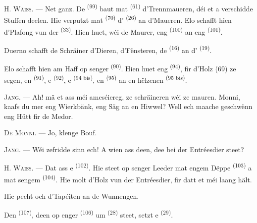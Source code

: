 \VUsaut{3.0mm}
\VUsaut{3.0mm}

H. \textsc{Wäiss}. --- Net ganz. De  \textsuperscript{(99)} baut mat
 \textsuperscript{(61)} d'Trennmaueren, déi et a verschidde Stuffen
deelen. Hie verputzt mat  \textsuperscript{(70)} d'
\textsuperscript{(26)} an d'Maueren. Elo schafft hien d'Plafong vun der
 \textsuperscript{(33)}. Hien huet, wéi de Maurer, eng 
\textsuperscript{(100)} an eng  \textsuperscript{(101)}.

Duerno schafft de Schräiner d'Dieren, d'Fënsteren, de 
\textsuperscript{(16)} an d' \textsuperscript{(19)}.

Elo schafft hien am Haff op senger  \textsuperscript{(90)}. Hien
huet eng  \textsuperscript{(94)}, fir d'Holz (69) ze segen, en
 \textsuperscript{(91)}, e 
\textsuperscript{(92)}, e  \textsuperscript{(94 bis)}, en
 \textsuperscript{(95)} an en hëlzenen 
\textsuperscript{(95 bis)}.

\textsc{Jang}. --- Ah! mä et ass méi ameséiereg, ze schräineren wéi ze mauren. Monni,
kaafs du mer eng Wierkbänk, eng Säg an en Hiwwel? Well ech maache geschwënn eng Hütt
fir de Medor.

\textsc{De Monni}. --- Jo, klenge Bouf.

\textsc{Jang}. --- Wéi zefridde sinn ech! A wien ass deen, dee bei der Entréesdier
steet?

\VUsaut{3.0mm}
\VUsaut{3.0mm}

H. \textsc{Wäiss}. --- Dat ass e  \textsuperscript{(102)}. Hie steet op
senger Leeder mat engem Dëppe  \textsuperscript{(103)} a mat sengem
 \textsuperscript{(104)}. Hie molt d'Holz vun der Entréesdier, fir datt
et méi laang hält.

Hie pecht och d'Tapéiten an de Wunnengen.

Den  \textsuperscript{(107)}, deen op enger 
\textsuperscript{(106)} um  \textsuperscript{(28)} steet, setzt e
 \textsuperscript{(29)}.


